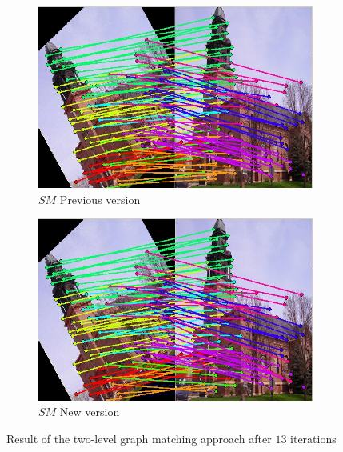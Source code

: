 \documentclass[
	fontsize=12pt,
	paper=a4,
	twoside=false,
	numbers=noenddot,
	plainheadsepline,
	toc=listof,
	toc=bibliography
]{scrartcl}
\begin{document}
\begin{figure}[ht] 
	\begin{subfigure}[b]{0.5\textwidth}
		\centering
		\includegraphics[scale=0.35]{fig/method1/test3/LL_it13.jpg} 
		\caption{$SM$ Previous version} 
	\end{subfigure}%
	\begin{subfigure}[b]{0.5\textwidth}
		\centering
		\includegraphics[scale=0.35]{test3/it11.jpg} 
		\caption{$SM$ New version} 
	\end{subfigure} 
	\caption{Result of the two-level graph matching approach after $13$ iterations }
\end{figure}

\newpage
	
\end{document}

